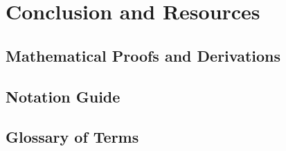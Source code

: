 \documentclass[12pt]{book}
\begin{document}
\part{Conclusion and Resources}


\appendix
\chapter{Mathematical Proofs and Derivations}

\chapter{Notation Guide}

\chapter{Glossary of Terms}
\end{document}
